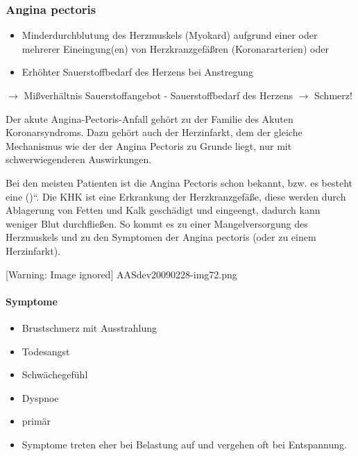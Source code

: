 \subsubsection[Angina pectoris]{Angina pectoris}

\begin{itemize}
	\item Minderdurchblutung des Herzmuskels (Myokard) aufgrund einer oder
	mehrerer Eineingung(en) von Herzkranzgefä{\ss}ren (Koronararterien)
	oder
	\item Erh\"ohter Sauerstoffbedarf des Herzens bei Anstregung
\end{itemize}
{\mdseries
${\rightarrow}$ Mi{\ss}verhältnis Sauerstoffangebot - 
Sauerstoffbedarf des Herzens ${\rightarrow}$ Schmerz!}

Der akute Angina-Pectoris-Anfall geh\"ort zu der Familie des Akuten
Koronarsyndroms. Dazu geh\"ort auch der Herzinfarkt, dem der gleiche
Mechanismus wie der der Angina Pectoris zu Grunde liegt, nur mit
schwer\-wiegenderen Auswirkungen. 

Bei den meisten Patienten ist die Angina Pectoris schon bekannt, bzw. es
besteht eine {\quotedblbase}
(){\textquotedblleft}. Die KHK ist
eine Erkrankung der Herzkranzgefä{\ss}e, diese werden durch
Ablagerung von Fetten und Kalk geschädigt und eingeengt, dadurch kann
weniger Blut durchflie{\ss}en. So kommt es zu einer Mangelversorgung
des Herzmuskels und zu den Symptomen der Angina pectoris (oder zu einem
Herzinfarkt). 


\begin{center}
 [Warning: Image ignored] {AASdev20090228-img72.png}

\end{center}

\paragraph{Symptome}

\begin{itemize}
	\item Brustschmerz mit Ausstrahlung
	\item Todesangst
	\item Schwächegef\"uhl
	\item Dyspnoe
	\item primär  
	\item Symptome treten eher bei Belastung auf und vergehen oft bei Entspannung.
\end{itemize}

